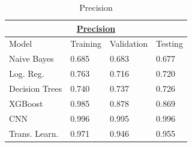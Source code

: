 \documentclass[10pt,twocolumn,letterpaper]{article}
\begin{document}
\begin{table}[]
   \begin{tabular}{|llll|}
   \hline
   \multicolumn{4}{|c|}{{\ul \textbf{Precision}}}                                                                   \\ \hline
   \multicolumn{1}{|l|}{Model}          & \multicolumn{1}{l|}{Training} & \multicolumn{1}{l|}{Validation} & Testing \\ \hline
   \multicolumn{1}{|l|}{Naive Bayes}    & \multicolumn{1}{l|}{0.685}    & \multicolumn{1}{l|}{0.683}      & 0.677   \\ \hline
   \multicolumn{1}{|l|}{Log. Reg.}      & \multicolumn{1}{l|}{0.763}    & \multicolumn{1}{l|}{0.716}      & 0.720   \\ \hline
   \multicolumn{1}{|l|}{Decision Trees} & \multicolumn{1}{l|}{0.740}    & \multicolumn{1}{l|}{0.737}      & 0.726   \\ \hline
   \multicolumn{1}{|l|}{XGBoost}        & \multicolumn{1}{l|}{0.985}    & \multicolumn{1}{l|}{0.878}      & 0.869   \\ \hline
   \multicolumn{1}{|l|}{CNN}            & \multicolumn{1}{l|}{0.996}    & \multicolumn{1}{l|}{0.995}      & 0.996   \\ \hline
   \multicolumn{1}{|l|}{Trans. Learn.}  & \multicolumn{1}{l|}{0.971}    & \multicolumn{1}{l|}{0.946}      & 0.955   \\ \hline
   \end{tabular}

\caption{Precision}
\end{table}
\end{document}
